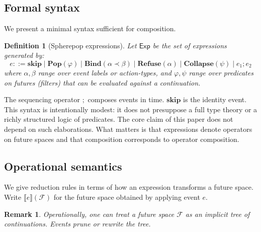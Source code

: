 \documentclass[11pt]{article}
\newtheorem{definition}{Definition}
\newtheorem{remark}{Remark}
\newcommand{\Future}{\mathcal{F}}
\begin{document}
\subsection{Formal syntax}

We present a minimal syntax sufficient for composition.

\begin{definition}[Spherepop expressions]
Let $\mathsf{Exp}$ be the set of expressions generated by:
\[
e ::= \mathbf{skip} \mid \mathbf{Pop}(\varphi) \mid \mathbf{Bind}(\alpha \prec \beta)
\mid \mathbf{Refuse}(\alpha) \mid \mathbf{Collapse}(\psi) \mid e_1 ; e_2
\]
where $\alpha,\beta$ range over event labels or action-types, and $\varphi,\psi$
range over predicates on futures (filters) that can be evaluated against a
continuation.
\end{definition}

The sequencing operator $;$ composes events in time. $\mathbf{skip}$ is the
identity event. This syntax is intentionally modest: it does not presuppose a
full type theory or a richly structured logic of predicates. The core claim of
this paper does not depend on such elaborations. What matters is that
expressions denote operators on future spaces and that composition corresponds
to operator composition.

\subsection{Operational semantics}

We give reduction rules in terms of how an expression transforms a future
space. Write $\llbracket e \rrbracket(\Future)$ for the future space obtained
by applying event $e$.

\begin{remark}
Operationally, one can treat a future space $\Future$ as an implicit tree of
continuations. Events prune or rewrite the tree.
\end{remark}
\end{document}
